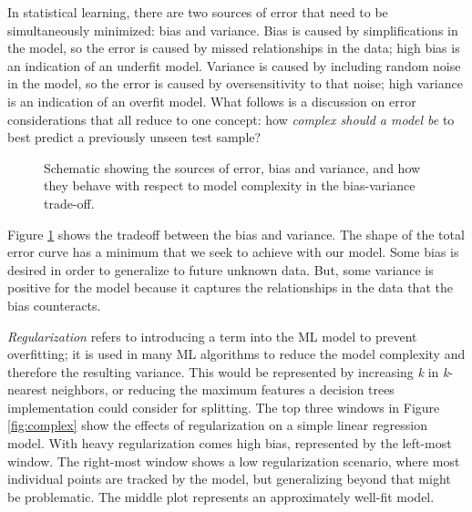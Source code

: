 In statistical learning, there are two sources of error that need to be
simultaneously minimized: bias and variance. Bias is caused by simplifications
in the model, so the error is caused by missed relationships in the data; high
bias is an indication of an underfit model.  Variance is caused by including
random noise in the model, so the error is caused by oversensitivity to that
noise; high variance is an indication of an overfit model. What follows is a
discussion on error considerations that all reduce to one concept: how
\textit{complex should a model be} to best predict a previously unseen test
sample?

\begin{figure}[!htb]
  \caption[Schematic of the bias-variance trade-off]
          {Schematic showing the sources of error, bias and variance, and how 
           they behave with respect to model complexity in the bias-variance 
           trade-off.}
  \label{fig:bvtradeoff}
\end{figure}

Figure \ref{fig:bvtradeoff} shows the tradeoff between the bias and variance.
The shape of the total error curve has a minimum that we seek to achieve with
our model. Some bias is desired in order to generalize to future unknown data.
But, some variance is positive for the model because it captures the
relationships in the data that the bias counteracts. 

\textit{Regularization} refers to introducing a term into the \gls{ML} model to
prevent overfitting; it is used in many \gls{ML} algorithms to reduce the model
complexity and therefore the resulting variance.  This would be represented by
increasing \textit{k} in \textit{k}-nearest neighbors, or reducing the maximum
features a decision trees implementation could consider for splitting.  The top
three windows in Figure \ref{fig:complex} show the effects of regularization on
a simple linear regression model. With heavy regularization comes high bias,
represented by the left-most window.  The right-most window shows a low
regularization scenario, where most individual points are tracked by the model,
but generalizing beyond that might be problematic. The middle plot represents an 
approximately well-fit model.  

